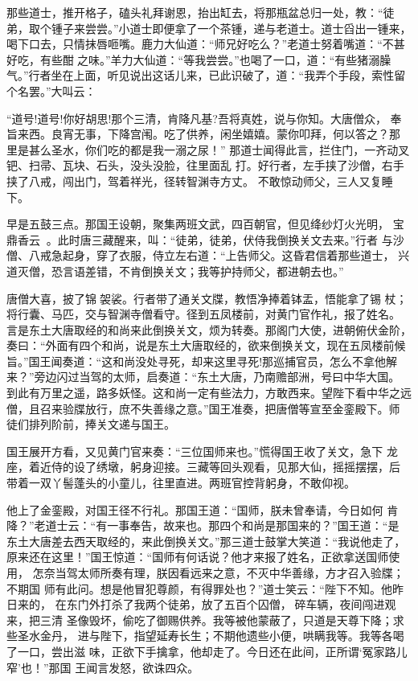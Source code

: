 那些道士，推开格子，磕头礼拜谢恩，抬出缸去，将那瓶盆总归一处，教：“徒
弟，取个锺子来尝尝。”小道士即便拿了一个茶锺，递与老道士。道士舀出一锺来，
喝下口去，只情抹唇咂嘴。鹿力大仙道：“师兄好吃么？”老道士努着嘴道：“不甚
好吃，有些酣之味。”羊力大仙道：“等我尝尝。”也喝了一口，道：“有些猪溺臊
气。”行者坐在上面，听见说出这话儿来，已此识破了，道：“我弄个手段，索性留
个名罢。”大叫云：

“道号!道号!你好胡思!那个三清，肯降凡基?吾将真姓，说与你知。大唐僧众，
奉旨来西。良宵无事，下降宫闱。吃了供养，闲坐嬉嬉。蒙你叩拜，何以答之？那
里是甚么圣水，你们吃的都是我一溺之尿！”
那道士闻得此言，拦住门，一齐动叉钯、扫帚、瓦块、石头，没头没脸，往里面乱
打。好行者，左手挟了沙僧，右手挟了八戒，闯出门，驾着祥光，径转智渊寺方丈。
不敢惊动师父，三人又复睡下。

早是五鼓三点。那国王设朝，聚集两班文武，四百朝官，但见绛纱灯火光明，
宝鼎香云。此时唐三藏醒来，叫：“徒弟，徒弟，伏侍我倒换关文去来。”行者
与沙僧、八戒急起身，穿了衣服，侍立左右道：“上告师父。这昏君信着那些道士，
兴道灭僧，恐言语差错，不肯倒换关文；我等护持师父，都进朝去也。”

唐僧大喜，披了锦袈裟。行者带了通关文牒，教悟净捧着钵盂，悟能拿了锡
杖；将行囊、马匹，交与智渊寺僧看守。径到五凤楼前，对黄门官作礼，报了姓名。
言是东土大唐取经的和尚来此倒换关文，烦为转奏。那阁门大使，进朝俯伏金阶，
奏曰：“外面有四个和尚，说是东土大唐取经的，欲来倒换关文，现在五凤楼前候
旨。”国王闻奏道：“这和尚没处寻死，却来这里寻死!那巡捕官员，怎么不拿他解
来？”旁边闪过当驾的太师，启奏道：“东土大唐，乃南赡部洲，号曰中华大国。
到此有万里之遥，路多妖怪。这和尚一定有些法力，方敢西来。望陛下看中华之远
僧，且召来验牒放行，庶不失善缘之意。”国王准奏，把唐僧等宣至金銮殿下。师
徒们排列阶前，捧关文递与国王。

国王展开方看，又见黄门官来奏：“三位国师来也。”慌得国王收了关文，急下
龙座，着近侍的设了绣墩，躬身迎接。三藏等回头观看，见那大仙，摇摇摆摆，后
带着一双丫髻蓬头的小童儿，往里直进。两班官控背躬身，不敢仰视。

他上了金銮殿，对国王径不行礼。那国王道：“国师，朕未曾奉请，今日如何
肯降？”老道士云：“有一事奉告，故来也。那四个和尚是那国来的？”国王道：“是
东土大唐差去西天取经的，来此倒换关文。”那三道士鼓掌大笑道：“我说他走了，
原来还在这里！”国王惊道：“国师有何话说？他才来报了姓名，正欲拿送国师使用，
怎奈当驾太师所奏有理，朕因看远来之意，不灭中华善缘，方才召入验牒；不期国
师有此问。想是他冒犯尊颜，有得罪处也？”道士笑云：“陛下不知。他昨日来的，
在东门外打杀了我两个徒弟，放了五百个囚僧，碎车辆，夜间闯进观来，把三清
圣像毁坏，偷吃了御赐供养。我等被他蒙蔽了，只道是天尊下降；求些圣水金丹，
进与陛下，指望延寿长生；不期他遗些小便，哄瞒我等。我等各喝了一口，尝出滋
味，正欲下手擒拿，他却走了。今日还在此间，正所谓‘冤家路儿窄’也！”那国
王闻言发怒，欲诛四众。

